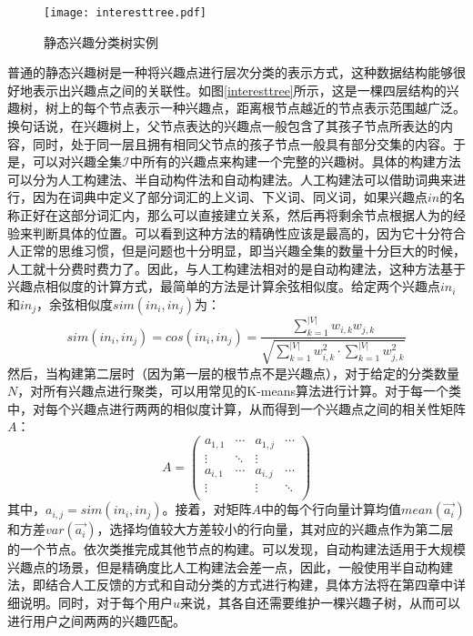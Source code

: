 \begin{figure}
\centering
\texttt{[image: interesttree.pdf]}
\caption{静态兴趣分类树实例}
\label{fig:interesttree}
\end{figure}

普通的静态兴趣树是一种将兴趣点进行层次分类的表示方式，这种数据结构能够很好地表示出兴趣点之间的关联性。如图\ref{interesttree}所示，这是一棵四层结构的兴趣树，树上的每个节点表示一种兴趣点，距离根节点越近的节点表示范围越广泛。换句话说，在兴趣树上，父节点表达的兴趣点一般包含了其孩子节点所表达的内容，同时，处于同一层且拥有相同父节点的孩子节点一般具有部分交集的内容。于是，可以对兴趣全集$\mathcal{I}$中所有的兴趣点来构建一个完整的兴趣树。具体的构建方法可以分为人工构建法、半自动构件法和自动构建法。人工构建法可以借助词典来进行，因为在词典中定义了部分词汇的上义词、下义词、同义词，如果兴趣点$in$的名称正好在这部分词汇内，那么可以直接建立关系，然后再将剩余节点根据人为的经验来判断具体的位置。可以看到这种方法的精确性应该是最高的，因为它十分符合人正常的思维习惯，但是问题也十分明显，即当兴趣全集的数量十分巨大的时候，人工就十分费时费力了。因此，与人工构建法相对的是自动构建法，这种方法基于兴趣点相似度的计算方式，最简单的方法是计算余弦相似度。给定两个兴趣点$in_i$和$in_j$，余弦相似度$sim(in_i,in_j)$为：
\begin{equation}
  sim(in_i,in_j)=cos(in_i,in_j)=\frac{\sum_{k=1}^{|V|}w_{i,k}w_{j,k}}{\sqrt{\sum_{k=1}^{|V|}w_{i,k}^{2}\cdot\sum_{k=1}^{|V|}w_{j,k}^{2}}}
\end{equation}
然后，当构建第二层时（因为第一层的根节点不是兴趣点），对于给定的分类数量$N$，对所有兴趣点进行聚类，可以用常见的K-means算法进行计算。对于每一个类中，对每个兴趣点进行两两的相似度计算，从而得到一个兴趣点之间的相关性矩阵$A$：
\begin{equation*}
  A=\left(
  \begin{array}{cccc}
    a_{1,1} & \cdots & a_{1,j} & \cdots \\
    \vdots & \ddots & \vdots & \\
    a_{i,1} & \cdots & a_{i,j} & \cdots \\
    \vdots & & \vdots & \ddots \\ 
  \end{array}
  \right)
\end{equation*}
其中，$a_{i,j}=sim(in_i,in_j)$。接着，对矩阵$A$中的每个行向量计算均值$mean(\vec{a_i})$和方差$var(\vec{a_i})$，选择均值较大方差较小的行向量，其对应的兴趣点作为第二层的一个节点。依次类推完成其他节点的构建。可以发现，自动构建法适用于大规模兴趣点的场景，但是精确度比人工构建法会差一点，因此，一般使用半自动构建法，即结合人工反馈的方式和自动分类的方式进行构建，具体方法将在第四章中详细说明。同时，对于每个用户$u$来说，其各自还需要维护一棵兴趣子树，从而可以进行用户之间两两的兴趣匹配。

